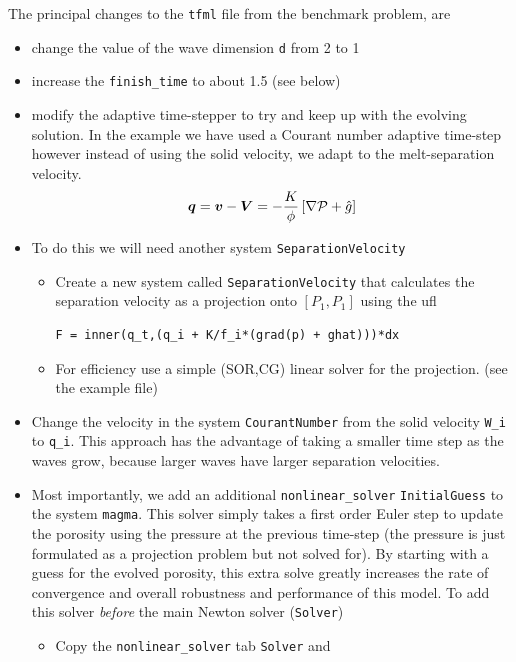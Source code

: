 The principal changes to the \texttt{tfml} file from the benchmark
problem, are
\begin{itemize}
\item change the value of the wave dimension \texttt{d} from 2 to 1
\item increase the \texttt{finish\_time} to about 1.5 (see below)
\item modify the adaptive time-stepper to try and keep up with the
evolving solution.  In the example we
have used a Courant number adaptive time-step however instead of
using the solid velocity, we adapt to the melt-separation velocity.
\begin{equation}
  \label{eq:sep-velocity}
{\mbox{\boldmath$q$}} ={\mbox{\boldmath$v$}} - {\mbox{\boldmath$V$}}  = -\frac{K}{\phi}
\left[
  \nabla\mathcal{P} + \hat{g}
\right] 
\end{equation}
\item To do this we will need another system \texttt{SeparationVelocity}
  \begin{itemize}
  \item Create a new system called \texttt{SeparationVelocity} that
    calculates the separation velocity as a projection onto $[P_{1},P_{1}]$ using the ufl
\begin{lstlisting}[style=UFL]
F = inner(q_t,(q_i + K/f_i*(grad(p) + ghat)))*dx
\end{lstlisting}
\item For efficiency use a simple (SOR,CG) linear solver for the
  projection. (see the example file)
  \end{itemize}
\item Change the velocity in the system \texttt{CourantNumber} from
  the solid velocity \texttt{W\_i} to \texttt{q\_i}. This approach has the advantage of
taking a smaller time step as the waves grow, because larger waves
have larger separation velocities.  
\item Most importantly,  we add an additional
  \texttt{nonlinear\_solver}  \texttt{InitialGuess} to the system
  \texttt{magma}.  This solver simply takes a first order Euler step
  to update the porosity using the pressure at the previous time-step
  (the pressure is just formulated as a projection problem but not
  solved for).  By starting with a guess for the evolved porosity,
  this extra solve greatly increases the rate of convergence and
  overall robustness and performance of this model. To add this solver
  \emph{before} the main Newton solver (\texttt{Solver})
  \begin{itemize}
  \item Copy the \texttt{nonlinear\_solver} tab \texttt{Solver} and

\end{itemize}
\end{itemize}
